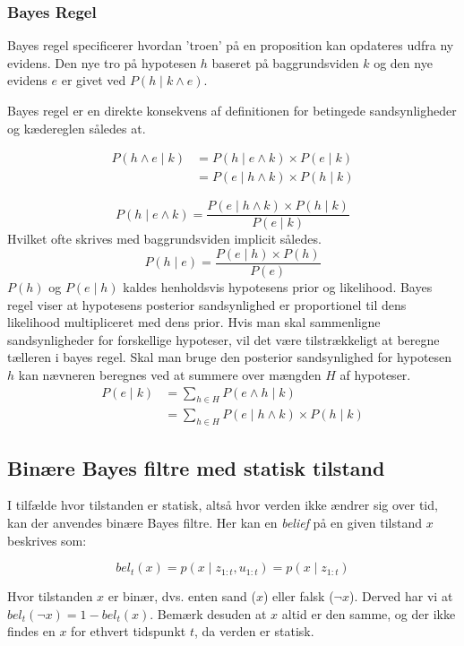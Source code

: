 \cite[s. 227]{ArtificialIntelligence}

\subsubsection{Bayes Regel}

Bayes regel specificerer hvordan 'troen' på en proposition kan opdateres udfra ny evidens.
Den nye tro på hypotesen $h$ baseret på baggrundsviden $k$ og den nye evidens $e$ er givet ved $P(h \mid k \wedge e)$.

Bayes regel er en direkte konsekvens af definitionen for betingede sandsynligheder og kædereglen således at. 

\begin{align*}
P(h \wedge e \mid k) &= P(h \mid e \wedge k) \times P(e \mid k) \\
&= P(e \mid h \wedge k) \times P(h \mid k)
\end{align*}

$$P(h \mid e \wedge k) = \frac{P(e \mid h \wedge k) \times P(h \mid k)}{P(e \mid k)}$$
Hvilket ofte skrives med baggrundsviden implicit således.
$$P(h \mid e) = \frac{P(e \mid h) \times P(h)}{P(e)}$$
$P(h)$ og $P(e \mid h)$ kaldes henholdsvis hypotesens prior og likelihood.
Bayes regel viser at hypotesens posterior sandsynlighed er proportionel til dens likelihood multipliceret med dens prior.
Hvis man skal sammenligne sandsynligheder for forskellige hypoteser, vil det være tilstrækkeligt at beregne tælleren i bayes regel.
Skal man bruge den posterior sandsynlighed for hypotesen $h$ kan nævneren beregnes ved at summere over mængden $H$ af hypoteser.
\begin{align*}
	P(e \mid k) &= \sum_{h \in H} P(e \wedge h \mid k) \\
	&= \sum_{h \in H}P(e \mid h \wedge k) \times P(h \mid k)
\end{align*}
\cite[s. 229]{ArtificialIntelligence}

\subsection{Binære Bayes filtre med statisk tilstand}\label{bayes_binaerfiltre}
I tilfælde hvor tilstanden er statisk, altså hvor verden ikke ændrer sig over tid, kan der anvendes binære Bayes filtre.
Her kan en \textit{belief} på en given tilstand $x$ beskrives som:

$$bel_t(x) = p(x \mid z_{1:t},u_{1:t}) = p(x \mid z_{1:t})$$

Hvor tilstanden $x$ er binær, dvs. enten sand ($x$) eller falsk ($\lnot x$).
Derved har vi at $bel_t(\lnot x) = 1 - bel_t(x)$.
Bemærk desuden at $x$ altid er den samme, og der ikke findes en $x$ for ethvert tidspunkt $t$, da verden er statisk. \\ \\
\cite[s. 94]{probabilisticRobotics}

